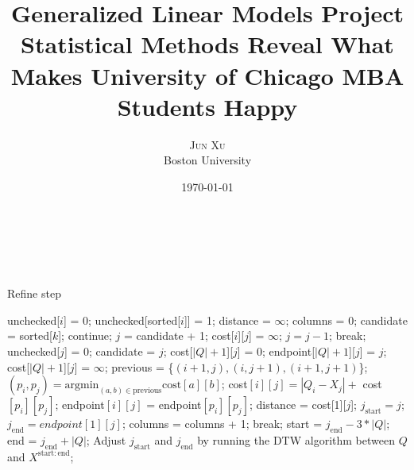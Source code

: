 \documentclass{article}
\title{\textbf{Generalized Linear Models Project} \\
	Statistical Methods Reveal What Makes University of Chicago MBA Students Happy}
\author{\textsc{Jun Xu}
	\\{Boston University}}
\date{\today}
\makeatletter
\renewcommand{\maketitle}{
	\begin{flushright}
		{\LARGE\@title}

		\vspace{50pt}

		{\large\@author}
		\\\@date

		\vspace{30pt}
	\end{flushright}
}
\makeatother
\begin{document}
\maketitle

\section*{}
\begin{algorithm}
	\caption{Refine step}
	\begin{algorithmic}[1]
			\State unchecked[$i$] = 0;
		\EndFor
		\State unchecked[sorted[$i$]] = 1;
	\EndFor
		\State distance = $\infty$;
		\State	columns = 0;
		\State candidate = sorted[$k$];
			\State continue;
		\EndIf
		\State $j$ = candidate + 1;
			\State cost[$i$][$j$] = $\infty$;
		\EndFor
			\State $j = j - 1$;
				\State break;
			\EndIf
				\State unchecked[$j$] = 0;
				\State candidate = $j$;
				\State cost[$|Q|+1$][$j$] = 0;
				\State endpoint[$|Q|+1$][$j$] = $j$;
			\Else
				\State cost[$|Q|+1$][$j$] = $\infty$;
			\EndIf
				\State previous = \{$(i+1, j), (i, j+1), (i+1, j+1)$\};
				\State $(p_i, p_j) = \mathrm{argmin}_{(a,b)\in\mathrm{previous}}\mathrm{cost}[a][b]$;
				\State cost$[i][j] = |Q_i - X_j| +$ cost$[p_i][p_j]$;
				\State endpoint$[i][j]$ = endpoint$[p_i][p_j]$;
			\EndFor
				\State distance = cost[1][$j$];
				\State $j_{\mathrm{start}} = j$;
				\State $j_{\mathrm{end}} = endpoint[1][j]$;
			\EndIf
			\State columns = columns + 1;
				\State break;
			\EndIf
		\EndWhile
	\EndFor
	\State start = $j_{\mathrm{end}} - 3*|Q|$;
	\State end = $j_{\mathrm{end}} + |Q|$;
	\State Adjust $j_{\mathrm{start}}$ and $j_{\mathrm{end}}$ by running the DTW algorithm between $Q$ and $X^{\mathrm{start:end}}$;
	\end{algorithmic}
\end{algorithm}
\end{document}
